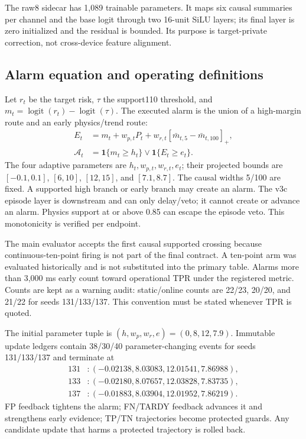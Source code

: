 \documentclass[10pt]{article}
\begin{document}
The raw8 sidecar has 1,089 trainable parameters.  It maps six causal summaries per channel and the base logit through two 16-unit SiLU layers; its final layer is zero initialized and the residual is bounded.  Its purpose is target-private correction, not cross-device feature alignment.

\subsection{Alarm equation and operating definitions}

Let $r_t$ be the target risk, $\tau$ the support110 threshold, and $m_t=\operatorname{logit}(r_t)-\operatorname{logit}(\tau)$.  The executed alarm is the union of a high-margin route and an early physics/trend route:
\begin{equation}
\begin{aligned}
E_t&=m_t+w_{p,t}P_t+w_{r,t}[\bar m_{t,5}-\bar m_{t,100}]_+,\\
\mathcal A_t&=\mathbf{1}\{m_t\ge h_t\}\lor\mathbf{1}\{E_t\ge e_t\}.
\end{aligned}
\end{equation}
The four adaptive parameters are $h_t,w_{p,t},w_{r,t},e_t$; their projected bounds are $[-0.1,0.1]$, $[6,10]$, $[12,15]$, and $[7.1,8.7]$.  The causal widths 5/100 are fixed.  A supported high branch or early branch may create an alarm.  The v3c episode layer is downstream and can only delay/veto; it cannot create or advance an alarm.  Physics support at or above 0.85 can escape the episode veto.  This monotonicity is verified per endpoint.

The main evaluator accepts the first causal supported crossing because continuous-ten-point firing is not part of the final contract.  A ten-point arm was evaluated historically and is not substituted into the primary table.  Alarms more than 3,000 ms early count toward operational TPR under the registered metric.  Counts are kept as a warning audit: static/online counts are 22/23, 20/20, and 21/22 for seeds 131/133/137.  This convention must be stated whenever TPR is quoted.

The initial parameter tuple is $(h,w_p,w_r,e)=(0,8,12,7.9)$.  Immutable update ledgers contain 38/30/40 parameter-changing events for seeds 131/133/137 and terminate at
\begin{equation}
\begin{aligned}
131 &: (-0.02138,8.03083,12.01541,7.86988),\\
133 &: (-0.02180,8.07657,12.03828,7.83735),\\
137 &: (-0.01883,8.03904,12.01952,7.86219).
\end{aligned}
\end{equation}
FP feedback tightens the alarm; FN/TARDY feedback advances it and strengthens early evidence; TP/TN trajectories become protected guards.  Any candidate update that harms a protected trajectory is rolled back.
\end{document}
